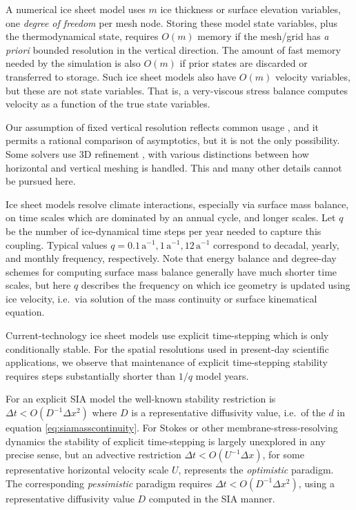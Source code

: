\documentclass[twocolumn,letterpaper]{igs}
\begin{document}
A numerical ice sheet model uses $m$ ice thickness or surface elevation variables, one \emph{degree of freedom} per mesh node.  Storing these model state variables, plus the thermodynamical state, requires $O(m)$ memory if the mesh/grid has \emph{a priori} bounded resolution in the vertical direction.  The amount of fast memory needed by the simulation is also $O(m)$ if prior states are discarded or transferred to storage.  Such ice sheet models also have $O(m)$ velocity variables, but these are not state variables.  That is, a very-viscous stress balance computes velocity as a function of the true state variables.

Our assumption of fixed vertical resolution reflects common usage \citep[for example]{Aschwandenetal2019,BrinkerhoffJohnson2015,Hoffmanetal2018,Lengetal2012,
Winkelmannetal2011}, and it permits a rational comparison of asymptotics, but it is not the only possibility.  Some solvers use 3D refinement \citep{BrownSmithAhmadia2013,IsaacStadlerGhattas2015,Tuminaroetal2016}, with various distinctions between how horizontal and vertical meshing is handled.  This and many other details cannot be pursued here.

Ice sheet models resolve climate interactions, especially via surface mass balance, on time scales which are dominated by an annual cycle, and longer scales.  Let $q$ be the number of ice-dynamical time steps per year needed to capture this coupling.  Typical values $q=0.1 \,\text{a}^{-1}, 1 \,\text{a}^{-1}, 12 \,\text{a}^{-1}$ correspond to decadal, yearly, and monthly frequency, respectively.  Note that energy balance and degree-day schemes for computing surface mass balance generally have much shorter time scales, but here $q$ describes the frequency on which ice geometry is updated using ice velocity, i.e.~via solution of the mass continuity or surface kinematical equation.

Current-technology ice sheet models use explicit time-stepping which is only conditionally stable.  For the spatial resolutions used in present-day scientific applications, we observe that maintenance of explicit time-stepping stability requires steps substantially shorter than $1/q$ model years.

For an explicit SIA model the well-known stability restriction is $\Delta t < O(D^{-1} \Delta x^2)$ \citep{Bueleretal2005,HindmarshPayne1996} where $D$ is a representative diffusivity value, i.e.~of the $d$ in equation \eqref{eq:siamasscontinuity}.  For Stokes or other membrane-stress-resolving dynamics the stability of explicit time-stepping is largely unexplored in any precise sense, but an advective restriction $\Delta t < O(U^{-1} \Delta x)$, for some representative horizontal velocity scale $U$, represents the \emph{optimistic} paradigm.  The corresponding \emph{pessimistic} paradigm requires $\Delta t < O(D^{-1} \Delta x^2)$, using a representative diffusivity value $D$ computed in the SIA manner.
\end{document}

